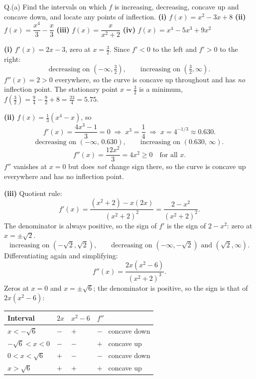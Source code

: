 \begin{question}{Q.(a)}
Find the intervals on which $f$ is increasing, decreasing, concave up and
concave down, and locate any points of inflection.
\textbf{(i)} $f(x)=x^{2}-3x+8$ \quad
\textbf{(ii)} $f(x)=\dfrac{x^{4}}{3}-\dfrac{x}{3}$ \quad
\textbf{(iii)} $f(x)=\dfrac{x}{x^{2}+2}$ \quad
\textbf{(iv)} $f(x)=x^{4}-5x^{3}+9x^{2}$
\end{question}

\begin{solution}
\textbf{(i)} $f'(x)=2x-3$, zero at $x=\tfrac32$. Since $f'<0$ to the left and
$f'>0$ to the right:
\[
\text{decreasing on }\left(-\infty,\tfrac32\right),\qquad
\text{increasing on }\left(\tfrac32,\infty\right).
\]
$f''(x)=2>0$ everywhere, so the curve is concave up throughout and has
\emph{no} inflection point. The stationary point $x=\tfrac32$ is a minimum,
$f(\tfrac32)=\tfrac94-\tfrac92+8=\tfrac{23}{4}=5.75$.

\medskip
\textbf{(ii)} $f(x)=\tfrac13(x^{4}-x)$, so
\[
f'(x)=\frac{4x^{3}-1}{3}=0 \;\Longrightarrow\; x^{3}=\frac14
\;\Longrightarrow\; x=4^{-1/3}\approx 0.630 .
\]
\[
\text{decreasing on }(-\infty,\,0.630),\qquad
\text{increasing on }(0.630,\,\infty).
\]
\[
f''(x)=\frac{12x^{2}}{3}=4x^{2}\ge 0 \quad\text{for all }x .
\]
$f''$ vanishes at $x=0$ but does \emph{not} change sign there, so the curve is
concave up everywhere and has no inflection point.

\medskip
\textbf{(iii)} Quotient rule:
\[
f'(x)=\frac{(x^{2}+2)-x(2x)}{(x^{2}+2)^{2}}=\frac{2-x^{2}}{(x^{2}+2)^{2}} .
\]
The denominator is always positive, so the sign of $f'$ is the sign of
$2-x^{2}$: zero at $x=\pm\sqrt2$.
\[
\text{increasing on }(-\sqrt2,\sqrt2),\qquad
\text{decreasing on }(-\infty,-\sqrt2)\text{ and }(\sqrt2,\infty).
\]
Differentiating again and simplifying:
\[
f''(x)=\frac{2x\left(x^{2}-6\right)}{(x^{2}+2)^{3}} .
\]
Zeros at $x=0$ and $x=\pm\sqrt6$; the denominator is positive, so the sign is
that of $2x(x^{2}-6)$:

\begin{center}
\small\sffamily
\begin{tabular}{@{}C{3.2cm} C{2.0cm} C{2.4cm} C{3.0cm}@{}}
\toprule
Interval & $2x$ & $x^{2}-6$ & $f''$ \\
\midrule
$x<-\sqrt6$          & $-$ & $+$ & $-$ \ concave down \\
$-\sqrt6<x<0$        & $-$ & $-$ & $+$ \ concave up \\
$0<x<\sqrt6$         & $+$ & $-$ & $-$ \ concave down \\
$x>\sqrt6$           & $+$ & $+$ & $+$ \ concave up \\
\bottomrule
\end{tabular}
\end{center}


\end{solution}
